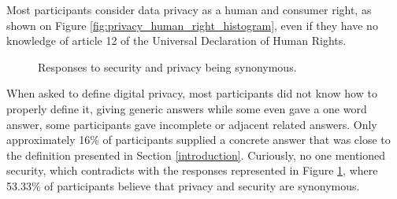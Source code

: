 Most participants consider data privacy as a human and consumer right,
as shown on Figure \ref{fig:privacy_human_right_histogram}, even if they have
no knowledge of article 12 of the Universal Declaration of Human Rights.

\begin{figure}
    \centering
    \caption{Responses to security and privacy being synonymous.}
    \label{fig:security_equals_privacy}
\end{figure}

When asked to define digital privacy, most participants did not know
how to properly define it, giving generic answers while some even gave a one word answer,
some participants gave incomplete or adjacent related answers. Only approximately
16\% of participants supplied a concrete answer that was close to the definition
presented in Section \ref{introduction}. Curiously, no one mentioned security,
which contradicts with the responses represented in Figure \ref{fig:security_equals_privacy},
where 53.33\% of participants believe that privacy and security are synonymous.

